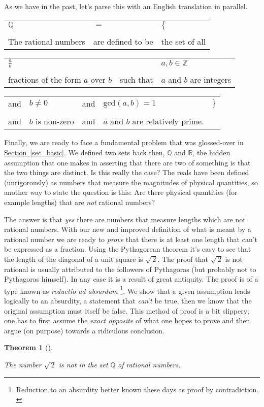 \documentclass[10pt,]{book}
\theoremstyle{plain}
\newtheorem{theorem}{Theorem}[section]
\theoremstyle{definition}
\theoremstyle{definition}
\numberwithin{equation}{section}
\newcommand{\hrulethin}  {\noalign{\hrule height 0.04em}}
\newcommand{\suchthat}{\;  \;}
\renewcommand{\gcd}[2]{\mbox{gcd} (#1, #2)}
\newcommand{\Integers}{{\mathbb Z}}
\newcommand{\Rationals}{{\mathbb Q}}
\newcommand{\Reals}{{\mathbb R}}
\begin{document}
    As we have in the past, let's parse this with an English translation in parallel.
\begin{tabular}{lll}
\(\Rationals\)&\(=\)&\(\{\)\tabularnewline[0pt]
&&\tabularnewline\hrulethin
The rational numbers&are defined to be&the set of all
\end{tabular}
\begin{tabular}{lll}
\(\displaystyle \frac{a}{b}\)&\(\suchthat\)&\(a,b \in \Integers\)\tabularnewline[0pt]
&&\tabularnewline\hrulethin
fractions of the form \(a\) over \(b\)&such that&\(a\) and \(b\) are integers
\end{tabular}
\begin{tabular}{lllll}
and&\(b \neq 0\)&and&\(\gcd{a}{b}=1\)&\(\}\)\tabularnewline[0pt]
&&&&\tabularnewline\hrulethin
and&\(b\) is non-zero&and&\(a\) and \(b\) are relatively prime.&
\end{tabular}
\par

    Finally, we are ready to face a fundamental problem that was
    glossed-over in \hyperref[sec_basic]{Section~\ref{sec_basic}}. We defined two sets
    back then, \(\Rationals\) and \(\Reals\), the hidden assumption that one
    makes in asserting that there are two of something is that the two
    things are distinct. Is this really the case? The reals have been
    defined (unrigorously) as numbers that measure the magnitudes of
    physical quantities, so another way to state the question is this:
    Are there physical quantities (for example lengths) that are \emph{not}
    rational numbers?
\par

    The answer is that \emph{yes} there are numbers that measure lengths
    which are not rational numbers. With our new and improved definition
    of what is meant by a rational number we are ready to \emph{prove} that
    there is at least one length that can't be expressed as a fraction.
    Using the Pythagorean theorem it's easy to see that the length of the
    diagonal of a unit square is \(\sqrt{\,2}\). The proof that \(\sqrt{\,2}\) is
    not rational is usually attributed to the followers of Pythagoras (but
    probably not to Pythagoras himself). In any case it is a result of
    great antiquity. The proof is of a type known as
     \emph{reductio ad absurdum}
    \footnote{Reduction to an absurdity \textemdash{} better known these 
    days as proof by contradiction. \label{fn-8}}. We show that a given assumption
    leads logically to an absurdity, a statement that \emph{can't} be true,
    then we know that the original assumption must itself be false. This
    method of proof is a bit slippery; one has to first assume the
    \emph{exact opposite} of what one hopes to prove and then argue (on
    purpose) towards a ridiculous conclusion.
\begin{theorem}[{}]\label{theorem-4}

        The number \(\sqrt{\,2}\) is not in the set \(\Rationals\) of
        rational numbers.
\end{theorem}
\par
\end{document}
